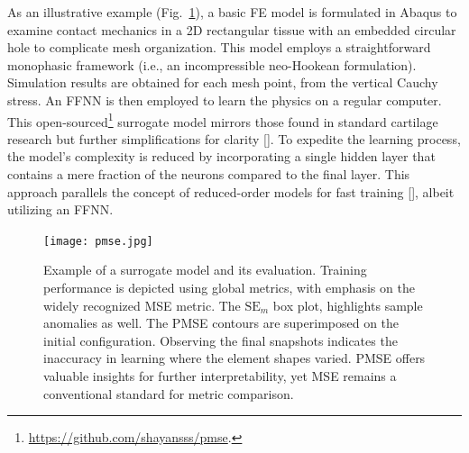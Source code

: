 As an illustrative example (Fig.~\ref{basic_surrogate}), a basic FE model is formulated in Abaqus to examine contact mechanics in a 2D rectangular tissue with an embedded circular hole to complicate mesh organization. This model employs a straightforward monophasic framework (i.e., an incompressible neo-Hookean formulation). Simulation results are obtained for each mesh point, from the vertical Cauchy stress. An FFNN is then employed to learn the physics on a regular computer. This open-sourced\footnote{\href{https://github.com/shayansss/pmse}{https://github.com/shayansss/pmse}.} surrogate model mirrors those found in standard cartilage research but further simplifications for clarity [\cite{paiva2012,arbabi2016a,arbabi2016b}]. To expedite the learning process, the model's complexity is reduced by incorporating a single hidden layer that contains a mere fraction of the neurons compared to the final layer. This approach parallels the concept of reduced-order models for fast training [\cite{pant2021}], albeit utilizing an FFNN.
%
\begin{figure}
    \centering
    \texttt{[image: pmse.jpg]}
    \caption{Example of a surrogate model and its evaluation. Training performance is depicted using global metrics, with emphasis on the widely recognized MSE metric. The \( \textrm{SE}_m \) box plot, highlights sample anomalies as well. The PMSE contours are superimposed on the initial configuration. Observing the final snapshots indicates the inaccuracy in learning where the element shapes varied. PMSE offers valuable insights for further interpretability, yet MSE remains a conventional standard for metric comparison.}
    \label{basic_surrogate}
\end{figure}

